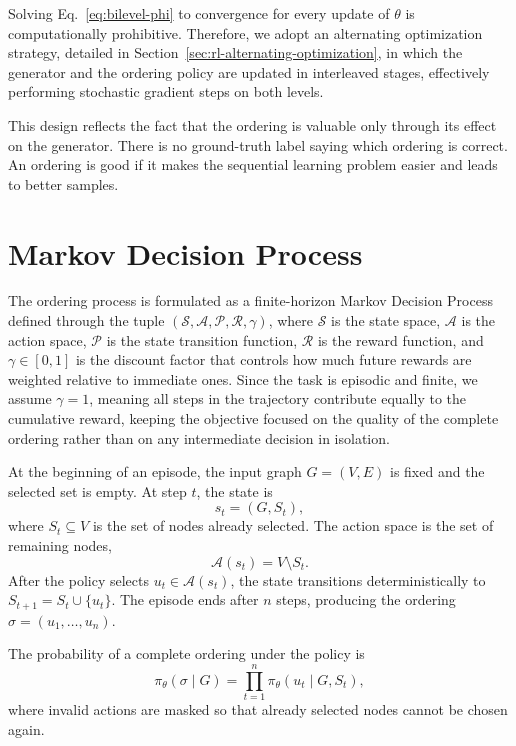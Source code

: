 Solving Eq.~\eqref{eq:bilevel-phi} to convergence for every update of $\theta$ is computationally prohibitive. Therefore, we adopt an alternating optimization strategy, detailed in Section~\ref{sec:rl-alternating-optimization}, in which the generator and the ordering policy are updated in interleaved stages, effectively performing stochastic gradient steps on both levels.

This design reflects the fact that the ordering is valuable only through its effect on the generator. There is no ground-truth label saying which ordering is correct. An ordering is good if it makes the sequential learning problem easier and leads to better samples.

\section{Markov Decision Process}
\label{sec:rl-mdp}

The ordering process is formulated as a finite-horizon Markov Decision Process defined
through the tuple $(\mathcal{S}, \mathcal{A}, \mathcal{P}, \mathcal{R}, \gamma)$, where
$\mathcal{S}$ is the state space, $\mathcal{A}$ is the action space, $\mathcal{P}$ is the
state transition function, $\mathcal{R}$ is the reward function, and $\gamma \in [0,1]$
is the discount factor that controls how much future rewards are weighted relative to
immediate ones. Since the task is episodic and finite, we assume $\gamma = 1$, meaning
all steps in the trajectory contribute equally to the cumulative reward, keeping the
objective focused on the quality of the complete ordering rather than on any intermediate
decision in isolation.

At the beginning of an episode, the input graph $G=(V,E)$ is fixed and the selected set is empty. At step $t$, the state is
\begin{equation}
    s_t=(G,S_t),
\end{equation}
where $S_t\subseteq V$ is the set of nodes already selected. The action space is the set of remaining nodes,
\begin{equation}
    \mathcal{A}(s_t)=V\setminus S_t.
\end{equation}
After the policy selects $u_t\in\mathcal{A}(s_t)$, the state transitions deterministically to $S_{t+1}=S_t\cup\{u_t\}$. The episode ends after $n$ steps, producing the ordering $\sigma=(u_1,\ldots,u_n)$.

The probability of a complete ordering under the policy is
\begin{equation}
    \pi_\theta(\sigma\mid G)
    = \prod_{t=1}^{n}\pi_\theta(u_t\mid G,S_t),
\end{equation}
where invalid actions are masked so that already selected nodes cannot be chosen again.

